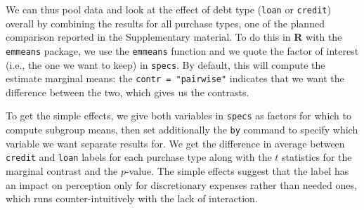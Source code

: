 \documentclass[
  11pt,
  letterpaper,
]{scrbook}
\theoremstyle{definition}
\theoremstyle{remark}
\begin{document}
We can thus pool data and look at the effect of debt type (\texttt{loan}
or \texttt{credit}) overall by combining the results for all purchase
types, one of the planned comparison reported in the Supplementary
material. To do this in \textbf{R} with the \texttt{emmeans} package, we
use the \texttt{emmeans} function and we quote the factor of interest
(i.e., the one we want to keep) in \texttt{specs}. By default, this will
compute the estimate marginal means: the \texttt{contr\ =\ "pairwise"}
indicates that we want the difference between the two, which gives us
the contrasts.

To get the simple effects, we give both variables in \texttt{specs} as
factors for which to compute subgroup means, then set additionally the
\texttt{by} command to specify which variable we want separate results
for. We get the difference in average between \texttt{credit} and
\texttt{loan} labels for each purchase type along with the \(t\)
statistics for the marginal contrast and the \(p\)-value. The simple
effects suggest that the label has an impact on perception only for
discretionary expenses rather than needed ones, which runs
counter-intuitively with the lack of interaction.
\end{document}
